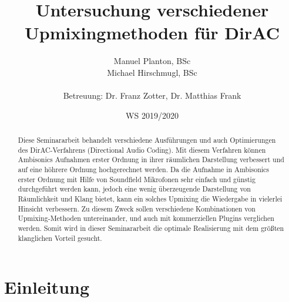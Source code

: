 \documentclass[12pt, a4paper]{article}
\begin{document}

\title{Untersuchung verschiedener Upmixingmethoden für DirAC}

\author{Manuel Planton, BSc \\ Michael Hirschmugl, BSc\\\\\small{Betreuung: Dr. Franz Zotter, Dr. Matthias Frank}}



\date{WS 2019/2020}

\maketitle
\newpage
\pagestyle{empty}
\hspace{1cm}\vspace{3cm}

\hspace{1cm}\vspace{1cm}

\begin{abstract}
   Diese Seminararbeit behandelt verschiedene Ausführungen und auch Optimierungen des DirAC-Verfahrens (Directional Audio Coding). Mit diesem Verfahren können Ambisonics Aufnahmen erster Ordnung in ihrer räumlichen Darstellung verbessert und auf eine höhrere Ordnung hochgerechnet werden.
   Da die Aufnahme in Ambisonics erster Ordnung mit Hilfe von Soundfield Mikrofonen sehr einfach und günstig durchgeführt werden kann, jedoch eine wenig überzeugende Darstellung von Räumlichkeit und Klang bietet, kann ein solches Upmixing die Wiedergabe in vielerlei Hinsicht verbessern.
   Zu diesem Zweck sollen verschiedene Kombinationen von Upmixing-Methoden untereinander, und auch mit kommerziellen Plugins verglichen werden. Somit wird in dieser Seminararbeit die optimale Realisierung mit dem größten klanglichen Vorteil gesucht.
\end{abstract}
\newpage
\pagestyle{myheadings}
\hspace{1cm}\vspace{2cm}

\tableofcontents
\newpage

\section{Einleitung}

\end{document}
